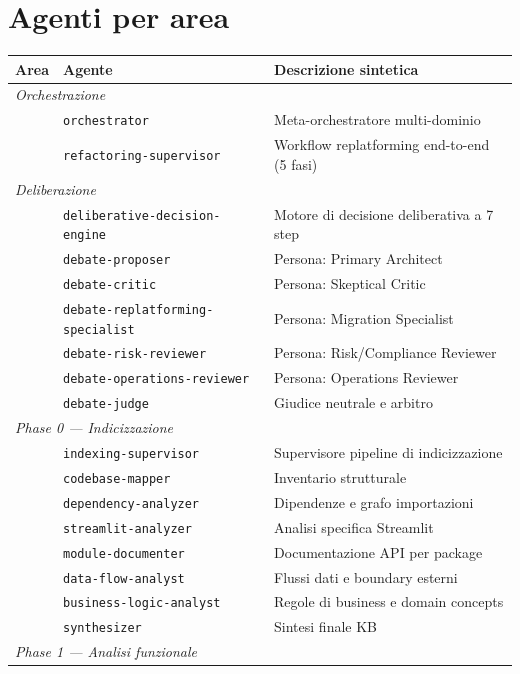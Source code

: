 \documentclass[12pt,a4paper,twoside]{book}
\begin{document}
\section{Agenti per area}

\begin{longtable}{llp{7cm}}
\toprule
\textbf{Area} & \textbf{Agente} & \textbf{Descrizione sintetica} \\
\midrule
\endhead
\multicolumn{3}{l}{\textit{Orchestrazione}} \\
 & \texttt{orchestrator} & Meta-orchestratore multi-dominio \\
 & \texttt{refactoring-supervisor} & Workflow replatforming end-to-end (5 fasi) \\
\midrule
\multicolumn{3}{l}{\textit{Deliberazione}} \\
 & \texttt{deliberative-decision-engine} & Motore di decisione deliberativa a 7 step \\
 & \texttt{debate-proposer} & Persona: Primary Architect \\
 & \texttt{debate-critic} & Persona: Skeptical Critic \\
 & \texttt{debate-replatforming-specialist} & Persona: Migration Specialist \\
 & \texttt{debate-risk-reviewer} & Persona: Risk/Compliance Reviewer \\
 & \texttt{debate-operations-reviewer} & Persona: Operations Reviewer \\
 & \texttt{debate-judge} & Giudice neutrale e arbitro \\
\midrule
\multicolumn{3}{l}{\textit{Phase 0 — Indicizzazione}} \\
 & \texttt{indexing-supervisor} & Supervisore pipeline di indicizzazione \\
 & \texttt{codebase-mapper} & Inventario strutturale \\
 & \texttt{dependency-analyzer} & Dipendenze e grafo importazioni \\
 & \texttt{streamlit-analyzer} & Analisi specifica Streamlit \\
 & \texttt{module-documenter} & Documentazione API per package \\
 & \texttt{data-flow-analyst} & Flussi dati e boundary esterni \\
 & \texttt{business-logic-analyst} & Regole di business e domain concepts \\
 & \texttt{synthesizer} & Sintesi finale KB \\
\midrule
\multicolumn{3}{l}{\textit{Phase 1 — Analisi funzionale}} \\

\end{longtable}
\end{document}
